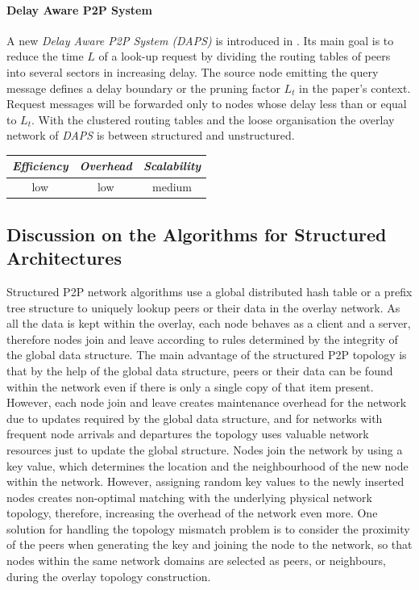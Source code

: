 \paragraph*{ \bf Delay Aware P2P System}
A new \emph{Delay Aware P2P System (DAPS)} is introduced in
\cite{zhang_daps_2005}. Its main goal is to reduce the time $L$ of a look-up
request by dividing the routing tables of peers into several sectors in
increasing delay. The source node emitting the query message defines a delay
boundary or the pruning factor $L_t$ in the paper's context. Request messages
will be forwarded only to nodes whose delay less than or equal to $L_t$. With
the clustered routing tables and the loose organisation the overlay network of
\emph{DAPS} is between structured and unstructured.

\begin{center}
\begin{tabular}{ccc}
\emph{Efficiency} & \emph{Overhead} & \emph{Scalability} \\
\hline
%
low &
%
low &
%
medium
\end{tabular}
\end{center}

\subsection{Discussion on the Algorithms for Structured Architectures}
Structured P2P network algorithms use a global distributed hash table or a
prefix tree structure to uniquely lookup peers or their data in the overlay
network. As all the data is kept within the overlay, each node behaves as a
client and a server, therefore nodes join and leave according to rules
determined by the integrity of the global data structure. The main advantage of
the structured P2P topology is that by the help of the global data structure,
peers or their data can be found within the network even if there is only a
single copy of that item present. However, each node join and leave creates
maintenance overhead for the network due to updates required by the global data
structure, and for networks with frequent node arrivals and departures the
topology uses valuable network resources just to update the global structure.
Nodes join the network by using a key value, which determines the location and
the neighbourhood of the new node within the network. However, assigning
random key values to the newly inserted nodes creates non-optimal matching with
the underlying physical network topology, therefore, increasing the overhead of
the network even more. One solution for handling the topology mismatch problem
is to consider the proximity of the peers when generating the key and joining
the node to the network, so that nodes within the same network domains are
selected as peers, or neighbours, during the overlay topology construction.

